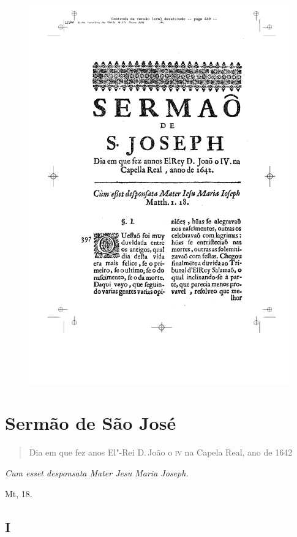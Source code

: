 \pagebreak
\thispagestyle{empty}
\movetoevenpage
\begin{figure}
\includegraphics[width=\textwidth]{./imgs/sjose.pdf}  
\end{figure}


\chapter{Sermão de São José}

\begin{quotation}
\noindent{}Dia em que fez anos El"-Rei D.\,João o \textsc{iv} na Capela Real, ano de 1642
\end{quotation}

\epigraph{\emph{Cum esset desponsata Mater Jesu Maria Joseph.}}{Mt, 18.}

\section*{I}

